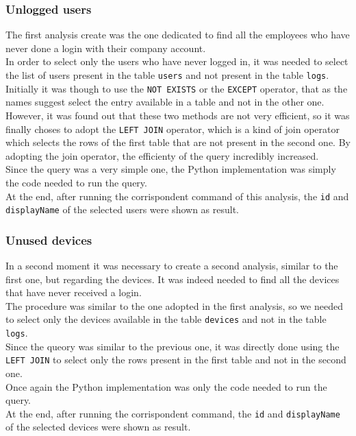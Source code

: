 \documentclass[12pt, a4paper, oneside]{article}
\begin{document}
\subsubsection{Unlogged users}
The first analysis create was the one dedicated to find all the employees who have never done a login with their company account.\\
In order to select only the users who have never logged in, it was needed to select the list of users present in the table \texttt{users} and not present in the table \texttt{logs}.\\
Initially it was though to use the \texttt{NOT EXISTS} or the \texttt{EXCEPT} operator, that as the names suggest select the entry available in a table and not in the other one.
However, it was found out that these two methods are not very efficient, so it was finally choses to adopt the \texttt{LEFT JOIN} operator, which is a kind of join operator which selects the rows of the 
first table that are not present in the second one. By adopting the join operator, the efficienty of the query incredibly increased.\\
Since the query was a very simple one, the Python implementation was simply the code needed to run the query.\\
At the end, after running the corrispondent command of this analysis, the \texttt{id} and \texttt{displayName} of the selected users were shown as result.

\newpage
\subsubsection{Unused devices}
In a second moment it was necessary to create a second analysis, similar to the first one, but regarding the devices. It was indeed needed to find all the devices that have never received a login.\\
The procedure was similar to the one adopted in the first analysis, so we needed to select only the devices available in the table \texttt{devices} and not in the table \texttt{logs}.\\
Since the queory was similar to the previous one, it was directly done using the \texttt{LEFT JOIN} to select only the rows present in the first table and not in the second one.\\
Once again the Python implementation was only the code needed to run the query.\\
At the end, after running the corrispondent command, the \texttt{id} and \texttt{displayName} of the selected devices were shown as result.
\end{document}

